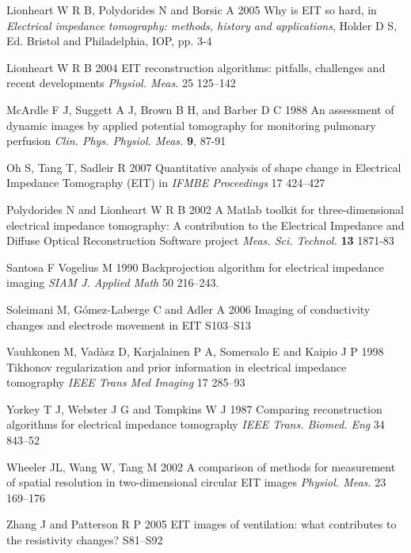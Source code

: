 \documentclass[12pt]{iopart}
\begin{document}
\item[]
Lionheart W R B, Polydorides N and Borsic A 2005 Why is EIT so hard,
in {\em Electrical impedance tomography: methods, history and
applications}, Holder D S, Ed. Bristol and Philadelphia, IOP, pp.
3-4

\item[]
Lionheart W R B 2004
EIT reconstruction algorithms: pitfalls, challenges
and recent developments
{\em Physiol. Meas.}
25 125--142

\item[]
McArdle F J, Suggett A J, Brown B H, and Barber D C 1988 An
assessment of dynamic images by applied potential tomography for
monitoring pulmonary perfusion {\em Clin. Phys. Physiol. Meas.}
{\bf 9}, 87-91

\item[]
Oh S, Tang T, Sadleir R 2007
Quantitative analysis of shape change in Electrical Impedance Tomography (EIT)
in {\em IFMBE Proceedings}
17 424--427

\item[]
Polydorides N and Lionheart W R B 2002 A Matlab toolkit for
three-dimensional electrical impedance tomography: A contribution
to the Electrical Impedance and Diffuse Optical Reconstruction
Software project {\em Meas. Sci. Technol.} {\bf 13} 1871-83

\item[]
Santosa F Vogelius M 1990
Backprojection algorithm for electrical impedance imaging
{\em SIAM J. Applied Math}
50 216--243. 


\item[]
Soleimani M, G\'omez-Laberge C and Adler A 2006 Imaging of
conductivity changes and electrode movement in EIT 
S103--S13

\item[]
Vauhkonen M, Vad\`asz D, Karjalainen P A, Somersalo E and
Kaipio J P 1998
 Tikhonov regularization and prior information in
electrical impedance tomography
 {\em IEEE Trans Med Imaging}
17 285--93

\item[]
Yorkey T J, Webster J G and Tompkins W J 1987
Comparing reconstruction algorithms for electrical
impedance tomography
{\em IEEE Trans. Biomed. Eng}
34 843--52

\item[]
Wheeler JL, Wang W, Tang M 2002
A comparison of methods for measurement of spatial resolution in two-dimensional circular EIT images
{\em Physiol. Meas.}
23 169--176

\item[]
Zhang J and Patterson R P 2005 EIT images of ventilation: what
contributes to the resistivity changes?  S81--S92

\endrefs
\end{document}
